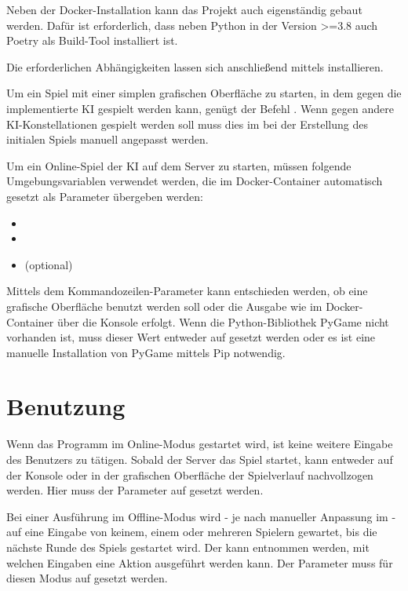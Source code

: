 Neben der Docker-Installation kann das Projekt auch eigenständig gebaut werden.
Dafür ist erforderlich, dass neben Python in der Version >=3.8 auch Poetry als Build-Tool installiert ist.

Die erforderlichen Abhängigkeiten lassen sich anschließend mittels  installieren.

Um ein Spiel mit einer simplen grafischen Oberfläche zu starten, in dem gegen die implementierte \ac{KI} gespielt
werden kann, genügt der Befehl .
Wenn gegen andere \ac{KI}-Konstellationen gespielt werden soll muss dies im  bei der Erstellung
des initialen Spiels manuell angepasst werden.

Um ein Online-Spiel der KI auf dem Server zu starten, müssen folgende Umgebungsvariablen verwendet werden, die im
Docker-Container automatisch gesetzt \bzw als Parameter übergeben werden:

\begin{itemize}
	\item {}
	\item {}
	\item {} (optional)
\end{itemize}

Mittels dem Kommandozeilen-Parameter  kann entschieden werden, ob eine grafische Oberfläche
benutzt werden soll oder die Ausgabe wie im Docker-Container über die Konsole erfolgt.
Wenn die Python-Bibliothek PyGame nicht vorhanden ist, muss dieser Wert entweder auf  gesetzt werden oder
es ist eine manuelle Installation von PyGame \bspw mittels Pip notwendig.

\section{Benutzung}
\label{sec:benutzung}

Wenn das Programm im Online-Modus gestartet wird, ist keine weitere Eingabe des Benutzers zu tätigen.
Sobald der Server das Spiel startet, kann entweder auf der Konsole oder in der grafischen Oberfläche der Spielverlauf
nachvollzogen werden.
Hier muss der Parameter  auf  gesetzt werden.

Bei einer Ausführung im Offline-Modus wird - je nach manueller Anpassung im  - auf eine
Eingabe von keinem, einem oder mehreren Spielern gewartet, bis die nächste Runde des Spiels gestartet wird.
Der  kann entnommen werden, mit welchen Eingaben eine Aktion ausgeführt werden kann.
Der Parameter  muss für diesen Modus auf  gesetzt werden.

